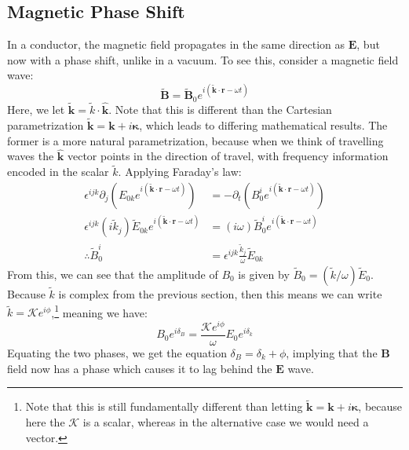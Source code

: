 \subsection{Magnetic Phase Shift} 
In a conductor, the magnetic field propagates in the same direction as \( \mathbf{E} \), but now with a phase
shift, unlike in a vacuum. To see this, consider a magnetic field wave:
\[
	\tilde{\mathbf{B}} = \tilde{\mathbf{B}}_0 e^{i(\tilde{\mathbf{k}} \cdot \mathbf{r} - \omega t)}
\]
Here, we let \( \tilde{\mathbf{k}} = \tilde k \cdot \mathbf{\hat{k}} \). Note that this is different than the
Cartesian parametrization \( \tilde{\mathbf{k}} = \mathbf{k} + i \boldsymbol{\kappa} \), which leads to
differing mathematical results. The former is a more natural parametrization, because when we think of
travelling waves the \( \mathbf{\hat{k}} \) vector points in the direction of travel, with frequency
information encoded in the scalar \( \tilde k \). Applying Faraday's law:
\begin{align*}
	\epsilon^{ijk}\partial_j \left(E_{0k}e^{i(\tilde{\mathbf{k}} \cdot \mathbf{r} - \omega t)}\right) &=
	-\partial_t \left(B_0^{i}e^{i(\tilde{\mathbf{k}} \cdot \mathbf{r} - \omega t)}\right)\\
	\epsilon^{ijk}(i \tilde k_j) \tilde E_{0k} e^{i(\tilde{\mathbf{k}} \cdot \mathbf{r} - \omega t)} &= (i
	\omega) \tilde B_0^{i} e^{i(\tilde{\mathbf{k}} \cdot \mathbf{r} - \omega t)}\\ 
	\therefore \tilde B_0^{i} &= \epsilon^{ijk} \frac{\tilde k_j}{\omega} \tilde E_{0k}
\end{align*}
From this, we can see that the amplitude of \( B_0 \) is given by \( \tilde B_0 = (\tilde k / \omega) \tilde
E_0\). Because \( \tilde k \) is complex from the previous section, then this means we can write \( \tilde k
= \mathcal{K} e^{i \phi}\),\footnote{Note that this is still fundamentally different than letting 
	\( \tilde{\mathbf{k}} = \mathbf{k} + i \boldsymbol{\kappa} \), because here the \(
\mathcal{K} \) is a scalar, whereas in the alternative case we would need a vector.} meaning we have:
\[
	B_0 e^{i \delta_B} = \frac{\mathcal{K} e^{i \phi}}{\omega} E_0 e^{i \delta_k }
\]
Equating the two phases, we get the equation \( \delta_B = \delta_k + \phi \), implying that the \(
\mathbf{B} \) field now has a phase which causes it to lag behind the \( \mathbf{E} \) wave.  
 











